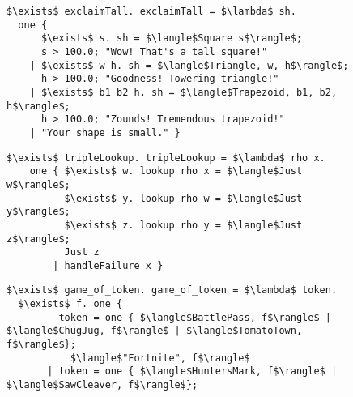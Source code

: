 \documentclass[manuscript,screen,review, 12pt, nonacm]{acmart}
\begin{document}
\begin{outline}[enumerate]
    \begin{figure}[ht] 
        \label{ fig7} 
        \begin{minipage}[h]{0.54\linewidth}
          \verselst
          \begin{lstlisting}[numbers=none, basicstyle=\tiny, xleftmargin=.2em,
                            showstringspaces=false,
                            frame=single]
$\exists$ exclaimTall. exclaimTall = $\lambda$ sh. 
  one { 
      $\exists$ s. sh = $\langle$Square s$\rangle$; 
      s > 100.0; "Wow! That's a tall square!"
    | $\exists$ w h. sh = $\langle$Triangle, w, h$\rangle$; 
      h > 100.0; "Goodness! Towering triangle!"
    | $\exists$ b1 b2 h. sh = $\langle$Trapezoid, b1, b2, h$\rangle$;
      h > 100.0; "Zounds! Tremendous trapezoid!"
    | "Your shape is small." }
            \end{lstlisting}
            \label{fig:verseexclaimtall} 
        \end{minipage}%
        \begin{minipage}[h]{0.5\linewidth}
          \verselst
          \begin{lstlisting}[numbers=none, basicstyle=\tiny, xleftmargin=2em,
                        frame=single]
$\exists$ tripleLookup. tripleLookup = $\lambda$ rho x. 
    one { $\exists$ w. lookup rho x = $\langle$Just w$\rangle$; 
          $\exists$ y. lookup rho w = $\langle$Just y$\rangle$; 
          $\exists$ z. lookup rho y = $\langle$Just z$\rangle$;
          Just z
        | handleFailure x }
          \end{lstlisting}
            \label{fig:versetriplelookup} 
        \vspace{4ex}
        \end{minipage} 
        \begin{minipage}[h]{\linewidth}
          \verselst
          \begin{lstlisting}[numbers=none, basicstyle=\tiny, xleftmargin=9em, 
                            frame=single]
$\exists$ game_of_token. game_of_token = $\lambda$ token. 
  $\exists$ f. one {
         token = one { $\langle$BattlePass, f$\rangle$ | $\langle$ChugJug, f$\rangle$ | $\langle$TomatoTown, f$\rangle$}; 
           $\langle$"Fortnite", f$\rangle$
       | token = one { $\langle$HuntersMark, f$\rangle$ | $\langle$SawCleaver, f$\rangle$}; 

\end{lstlisting}
\end{minipage}
\end{figure}
\end{outline}
\end{document}
